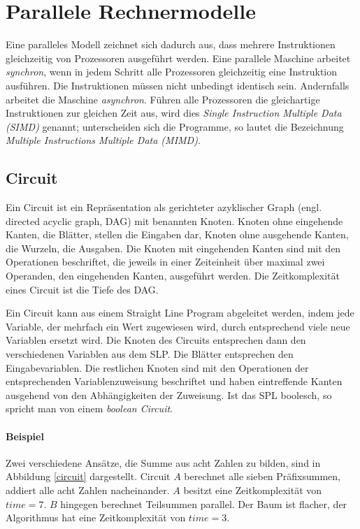 \section{Parallele Rechnermodelle}
Eine paralleles Modell zeichnet sich dadurch aus, dass mehrere Instruktionen
gleichzeitig von Prozessoren ausgeführt werden.
Eine parallele Maschine arbeitet \emph{synchron}, wenn in jedem Schritt alle
Prozessoren gleichzeitig eine Instruktion ausführen.
Die Instruktionen müssen nicht unbedingt identisch sein.
Andernfalls arbeitet die Maschine \emph{asynchron}.
Führen alle Prozessoren die gleichartige Instruktionen zur gleichen Zeit aus,
wird dies \emph{Single Instruction Multiple Data (SIMD)} genannt; unterscheiden
sich die Programme, so lautet die Bezeichnung
\emph{Multiple Instructions Multiple Data (MIMD)}.

\subsection{Circuit}
Ein Circuit ist ein Repräsentation als gerichteter azyklischer Graph
(engl. directed acyclic graph, DAG) mit benannten Knoten.
Knoten ohne eingehende Kanten, die Blätter, stellen die Eingaben dar, Knoten
ohne ausgehende Kanten, die Wurzeln, die Ausgaben.
Die Knoten mit eingehenden Kanten sind mit den Operationen beschriftet, die
jeweils in einer Zeiteinheit über maximal zwei Operanden, den eingehenden
Kanten, ausgeführt werden.
Die Zeitkomplexität eines Circuit ist die Tiefe des DAG.

Ein Circuit kann aus einem Straight Line Program abgeleitet werden, indem jede
Variable, der mehrfach ein Wert zugewiesen wird, durch entsprechend viele neue
Variablen ersetzt wird.
Die Knoten des Circuits entsprechen dann den verschiedenen Variablen aus dem
SLP.
Die Blätter entsprechen den Eingabevariablen.
Die restlichen Knoten sind mit den Operationen der entsprechenden
Variablenzuweisung beschriftet und haben eintreffende Kanten ausgehend von den
Abhängigkeiten der Zuweisung.
Ist das SPL boolesch, so spricht man von einem \emph{boolean Circuit}.
\cite[S.7]{jaja}\cite[S.11f.]{reif}

\paragraph{Beispiel}
Zwei verschiedene Ansätze, die Summe aus acht Zahlen zu bilden, sind in
Abbildung \ref{circuit} dargestellt.
Circuit $A$ berechnet alle sieben Präfixsummen, addiert alle acht Zahlen
nacheinander.
$A$ besitzt eine Zeitkomplexität von $time = 7$.
$B$ hingegen berechnet Teilsummen parallel.
Der Baum ist flacher, der Algorithmus hat eine Zeitkomplexität von $time = 3$.

